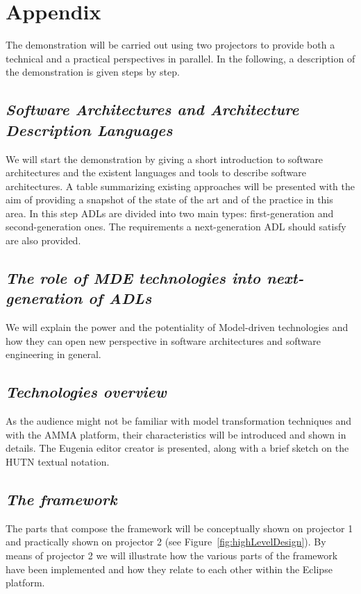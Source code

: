 
\section{Appendix}

The demonstration will be carried out using two projectors to
provide both a technical and a practical perspectives in parallel.
In the following, a description of the demonstration is given steps
by step.

\subsection{\em Software Architectures and Architecture Description Languages}
We will start the demonstration by giving a short introduction to
software architectures and the existent languages and tools to
describe software architectures. A table summarizing existing
approaches will be presented with the aim of providing a snapshot of
the state of the art and of the practice in this area.
In this step ADLs are divided into two main types: first-generation and second-generation ones.
The requirements a next-generation ADL should satisfy are also provided.

\subsection{\em The role of MDE technologies into next-generation of ADLs}
We will explain the power and the potentiality of Model-driven
technologies and how they can open new perspective in software
architectures and software engineering in general.

\subsection{\em Technologies overview}
 As the audience might not be
familiar with model transformation techniques and with the AMMA
platform, their characteristics will be introduced and shown in
details. The Eugenia editor creator is presented, along with  a brief sketch on
the HUTN textual notation.

\subsection{\em The \name{} framework}
The parts that compose the \name{} framework will be conceptually
shown on projector 1 and practically shown on projector 2 (see
Figure~\ref{fig:highLevelDesign}). By means of projector 2 we will
illustrate how the various parts of the \name{} framework have been implemented
and how they relate to each other within the Eclipse platform.

